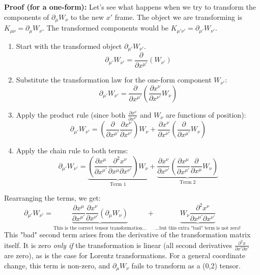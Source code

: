 \documentclass[11pt, a4paper]{report}
\begin{document}
\textbf{Proof (for a one-form):}
Let's see what happens when we try to transform the components of $\partial_\mu W_\nu$ to the new $x'$ frame. The object we are transforming is $K_{\mu\nu} = \partial_\mu W_\nu$. The transformed components would be $K_{\mu'\nu'} = \partial_{\mu'} W_{\nu'}$.
\begin{enumerate}
    \item Start with the transformed object $\partial_{\mu'} W_{\nu'}$.
    \[
        \partial_{\mu'} W_{\nu'} = \frac{\partial}{\partial x^{\mu'}} \left( W_{\nu'} \right)
    \]
    \item Substitute the transformation law for the one-form component $W_{\nu'}$:
    \[
        \partial_{\mu'} W_{\nu'} = \frac{\partial}{\partial x^{\mu'}} \left( \frac{\partial x^\nu}{\partial x^{\nu'}} W_\nu \right)
    \]
    \item Apply the product rule (since both $\frac{\partial x^\nu}{\partial x^{\nu'}}$ and $W_\nu$ are functions of position):
    \[
        \partial_{\mu'} W_{\nu'} = \left( \frac{\partial}{\partial x^{\mu'}} \frac{\partial x^\nu}{\partial x^{\nu'}} \right) W_\nu + \frac{\partial x^\nu}{\partial x^{\nu'}} \left( \frac{\partial}{\partial x^{\mu'}} W_\nu \right)
    \]
    \item Apply the chain rule to both terms:
    \[
        \partial_{\mu'} W_{\nu'} = \underbrace{ \left( \frac{\partial x^\mu}{\partial x^{\mu'}} \frac{\partial^2 x^\nu}{\partial x^\mu \partial x^{\nu'}} \right) W_\nu }_{\text{Term 1}} + \underbrace{ \frac{\partial x^\nu}{\partial x^{\nu'}} \left( \frac{\partial x^\mu}{\partial x^{\mu'}} \frac{\partial}{\partial x^\mu} W_\nu \right) }_{\text{Term 2}}
    \]
\end{enumerate}
Rearranging the terms, we get:
\begin{equation}
    \partial_{\mu'} W_{\nu'} = 
    \underbrace{
    \frac{\partial x^\mu}{\partial x^{\mu'}} \frac{\partial x^\nu}{\partial x^{\nu'}} (\partial_\mu W_\nu)
    }_{\text{This is the correct tensor transformation...}}
    +
    \underbrace{
    W_\nu \frac{\partial^2 x^\nu}{\partial x^{\mu'} \partial x^{\nu'}}
    }_{\text{...but this extra "bad" term is not zero!}}
\end{equation}
This "bad" second term arises from the derivative of the transformation matrix itself. It is zero \emph{only if} the transformation is linear (all second derivatives $\frac{\partial^2 x}{\partial x' \partial x'}$ are zero), as is the case for Lorentz transformations. For a general coordinate change, this term is non-zero, and $\partial_\mu W_\nu$ fails to transform as a (0,2) tensor.
\end{document}
